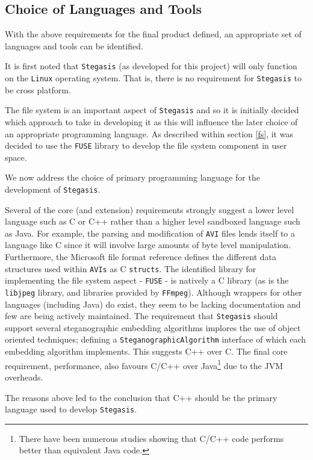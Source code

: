 \documentclass[paper=a4, fontsize=11pt,twoside]{scrartcl}    %
\numberwithin{table}{section}
\numberwithin{figure}{section}
\begin{document}
\subsection{Choice of Languages and Tools}

With the above requirements for the final product defined, an appropriate set of languages and tools can be identified.

It is first noted that \texttt{Stegasis} (as developed for this project) will only function on the \texttt{Linux} operating system. That is, there is no requirement for \texttt{Stegasis} to be cross platform.  

The file system is an important aspect of \texttt{Stegasis} and so it is initially decided which approach to take in developing it as this will influence the later choice of an appropriate programming language. As described within section \ref{fs}, it was decided to use the \texttt{FUSE} library to develop the file system component in user space.

We now address the choice of primary programming language for the development of \texttt{Stegasis}.

Several of the core (and extension) requirements strongly suggest a lower level language such as C or C++ rather than a higher level sandboxed language such as Java. For example, the parsing and modification of \texttt{AVI} files lends itself to a language like C since it will involve large amounts of byte level manipulation. Furthermore, the Microsoft file format reference defines the different data structures used within \texttt{AVIs} as C \texttt{structs}. The identified library for implementing the file system aspect - \texttt{FUSE} - is natively a C library (as is the \texttt{libjpeg} library, and libraries provided by \texttt{FFmpeg}). Although wrappers for other languages (including Java) do exist, they seem to be lacking documentation and few are being actively maintained. The requirement that \texttt{Stegasis} should support several steganographic embedding algorithms implores the use of object oriented techniques; defining a \texttt{SteganographicAlgorithm} interface of which each embedding algorithm implements. This suggests C++ over C. The final core requirement, performance, also favours C/C++ over Java\footnote{There have been numerous studies showing that C/C++ code performs better than equivalent Java code.} due to the JVM overheads. 

The reasons above led to the conclusion that C++ should be the primary language used to develop \texttt{Stegasis}.
\end{document}
